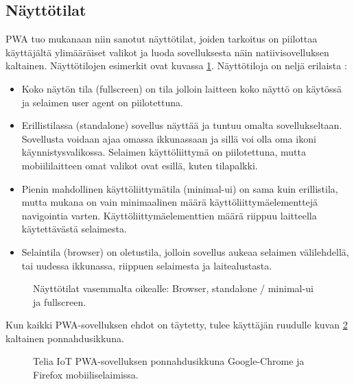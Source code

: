 \documentclass{tktltiki}
\begin{document}
\subsection{Näyttötilat}

PWA tuo mukanaan niin sanotut näyttötilat, joiden tarkoitus on piilottaa käyttäjältä ylimääräiset valikot ja luoda sovelluksesta näin natiivisovelluksen kaltainen. Näyttötilojen esimerkit ovat kuvassa \ref{Näyttötilat}. Näyttötiloja on neljä erilaista \cite{Mozilla}:

\begin{itemize}
  \item Koko näytön tila (fullscreen) on tila jolloin laitteen koko näyttö on käytössä ja selaimen user agent on piilotettuna.
  \item Erillistilassa (standalone) sovellus näyttää ja tuntuu omalta sovellukseltaan. Sovellusta voidaan ajaa omassa ikkunassaan ja sillä voi olla oma ikoni käynnistysvalikossa. Selaimen käyttöliittymä on piilotettuna, mutta mobiililaitteen omat valikot ovat esillä, kuten tilapalkki. 
  \item Pienin mahdollinen käyttöliittymätila (minimal-ui) on sama kuin erillistila, mutta mukana on vain minimaalinen määrä käyttöliittymäelementtejä navigointia varten. Käyttöliittymäelementtien määrä riippuu laitteella käytettävästä selaimesta. 
  \item Selaintila (browser) on oletustila, jolloin sovellus aukeaa selaimen välilehdellä, tai uudessa ikkunassa, riippuen selaimesta ja laitealustasta. 
\end{itemize}

\begin{figure}[!htbp]
\begin{center}
\caption{Näyttötilat vasemmalta oikealle: Browser, standalone / minimal-ui ja fullscreen.}
\label{Näyttötilat}
\end{center}
\end{figure}

Kun kaikki PWA-sovelluksen ehdot on täytetty, tulee käyttäjän ruudulle kuvan \ref{asennusbanneri} kaltainen ponnahdusikkuna.

\begin{figure}[!htbp]
\begin{center}
\caption{Telia IoT PWA-sovelluksen ponnahdusikkuna Google-Chrome ja Firefox mobiiliselaimissa.}
\label{asennusbanneri}
\end{center}
\end{figure}
\end{document}

